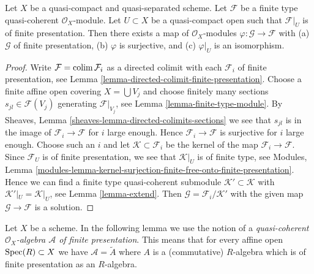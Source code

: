 \begin{lemma}
\label{lemma-application-directed-colimit}
Let $X$ be a quasi-compact and quasi-separated scheme.
Let $\mathcal{F}$ be a finite type quasi-coherent $\mathcal{O}_X$-module.
Let $U \subset X$ be a quasi-compact open such that $\mathcal{F}|_U$
is of finite presentation. Then there exists a map of $\mathcal{O}_X$-modules
$\varphi : \mathcal{G} \to \mathcal{F}$ with
(a) $\mathcal{G}$ of finite presentation,
(b) $\varphi$ is surjective, and
(c) $\varphi|_U$ is an isomorphism.
\end{lemma}

\begin{proof}
Write $\mathcal{F} = \mathop{\mathrm{colim}}\nolimits \mathcal{F}_i$ as a directed colimit
with each $\mathcal{F}_i$ of finite presentation,
see Lemma \ref{lemma-directed-colimit-finite-presentation}.
Choose a finite affine open covering $X = \bigcup V_j$ and choose
finitely many sections $s_{jl} \in \mathcal{F}(V_j)$ generating
$\mathcal{F}|_{V_j}$, see Lemma \ref{lemma-finite-type-module}.
By Sheaves, Lemma \ref{sheaves-lemma-directed-colimits-sections}
we see that $s_{jl}$ is in the image of $\mathcal{F}_i \to \mathcal{F}$
for $i$ large enough. Hence $\mathcal{F}_i \to \mathcal{F}$ is surjective
for $i$ large enough. Choose such an $i$ and let
$\mathcal{K} \subset \mathcal{F}_i$ be the kernel of the map
$\mathcal{F}_i \to \mathcal{F}$. Since $\mathcal{F}_U$ is of finite
presentation, we see that $\mathcal{K}|_U$ is of finite type, see
Modules, Lemma
\ref{modules-lemma-kernel-surjection-finite-free-onto-finite-presentation}.
Hence we can find a finite type quasi-coherent submodule
$\mathcal{K}' \subset \mathcal{K}$ with $\mathcal{K}'|_U = \mathcal{K}|_U$,
see Lemma \ref{lemma-extend}. Then
$\mathcal{G} = \mathcal{F}_i/\mathcal{K}'$
with the given map $\mathcal{G} \to \mathcal{F}$ is a solution.
\end{proof}

\noindent
Let $X$ be a scheme. In the following lemma we use the notion
of a {\it quasi-coherent $\mathcal{O}_X$-algebra $\mathcal{A}$
of finite presentation}. This means that for every affine open
$\mathop{\mathrm{Spec}}(R) \subset X$ we have $\mathcal{A} = \widetilde{A}$
where $A$ is a (commutative) $R$-algebra which is of finite presentation
as an $R$-algebra.


